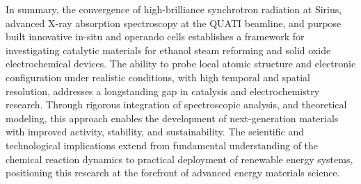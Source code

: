 
In summary, the convergence of high-brilliance synchrotron radiation at Sirius, advanced X-ray absorption spectroscopy at the QUATI beamline, and purpose built innovative in-situ and operando cells establishes a framework for investigating catalytic materials for ethanol steam reforming and solid oxide electrochemical devices. The ability to probe local atomic structure and electronic configuration under realistic conditions, with high temporal and spatial resolution, addresses a longstanding gap in catalysis and electrochemistry research. Through rigorous integration of spectroscopic analysis, and theoretical modeling, this approach enables the development of next-generation materials with improved activity, stability, and sustainability. The scientific and technological implications extend from fundamental understanding of the chemical reaction dynamics to practical deployment of renewable energy systems, positioning this research at the forefront of advanced energy materials science.